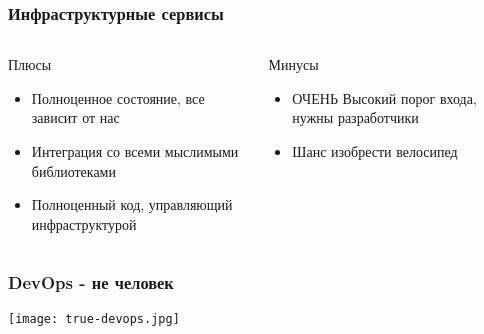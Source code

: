 \documentclass[mathserif,serif]{beamer}
\begin{document}
\begin{frame}
	\frametitle{Инфраструктурные сервисы}
	\begin{columns}[T]
		\begin{column}{.5\linewidth}
			\begin{minipage}[c][\textheight][c]{\linewidth}
          			Плюсы
				\begin{itemize}
					\item{Полноценное состояние, все зависит от нас}
					\item{Интеграция со всеми мыслимыми библиотеками}
					\item{Полноценный код, управляющий инфраструктурой}
				\end{itemize}
			\end{minipage}
		\end{column}
		\begin{column}{.5\linewidth}
			\begin{minipage}[c][\textheight][c]{\linewidth}
          			Минусы
				\begin{itemize}
					\item{ОЧЕНЬ Высокий порог входа, нужны разработчики}
					\item{Шанс изобрести велосипед}
				\end{itemize}
			\end{minipage}
		\end{column}
	\end{columns}
\end{frame}

\begin{frame}
	\frametitle{DevOps - не человек}
	\texttt{[image: true-devops.jpg]}
\end{frame}
\end{document}
